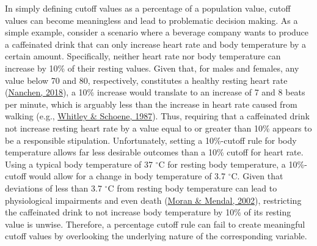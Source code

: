 \documentclass[
12pt, %
twoside,
english]{guelphthesis}
\begin{document}
In simply defining cutoff values as a percentage of a population value, cutoff values can become meaningless and lead to problematic decision making. As a simple example, consider a scenario where a beverage company wants to produce a caffeinated drink that can only increase heart rate and body temperature by a certain amount. Specifically, neither heart rate nor body temperature can increase by 10\% of their resting values. Given that, for males and females, any value below 70 and 80, respectively, constitutes a healthy resting heart rate (\protect\hyperlink{ref-nanchen2018}{Nanchen, 2018}), a 10\% increase would translate to an increase of 7 and 8 beats per minute, which is arguably less than the increase in heart rate caused from walking (e.g., \protect\hyperlink{ref-whitley1987}{Whitley \& Schoene, 1987}). Thus, requiring that a caffeinated drink not increase resting heart rate by a value equal to or greater than 10\% appears to be a responsible stipulation. Unfortunately, setting a 10\%-cutoff rule for body temperature allows far less desirable outcomes than a 10\% cutoff for heart rate. Using a typical body temperature of 37 \(^\circ\)C for resting body temperature, a 10\%-cutoff would allow for a change in body temperature of 3.7 \(^\circ\)C. Given that deviations of less than 3.7 \(^\circ\)C from resting body temperature can lead to physiological impairments and even death (\protect\hyperlink{ref-moran2002}{Moran \& Mendal, 2002}), restricting the caffeinated drink to not increase body temperature by 10\% of its resting value is unwise. Therefore, a percentage cutoff rule can fail to create meaningful cutoff values by overlooking the underlying nature of the corresponding variable.
\end{document}
